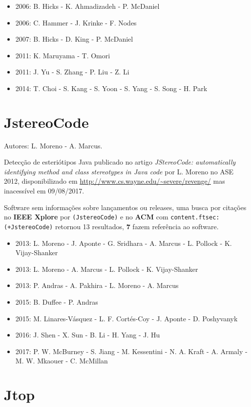 \begin{itemize}
\item 2006: B. Hicks - K. Ahmadizadeh - P. McDaniel
\item 2006: C. Hammer - J. Krinke - F. Nodes
\item 2007: B. Hicks - D. King - P. McDaniel
\item 2011: K. Maruyama - T. Omori
\item 2011: J. Yu - S. Zhang - P. Liu - Z. Li
\item 2014: T. Choi - S. Kang - S. Yoon - S. Yang - S. Song - H. Park
\end{itemize}

\section{JstereoCode}

Autores:
L. Moreno - A. Marcus.

Detecção de esteriótipos Java
publicado no artigo {\it JStereoCode: automatically identifying method and class stereotypes in Java code}
por L. Moreno
no ASE 2012,
disponibilizado em \url{http://www.cs.wayne.edu/~severe/revenge/}
mas inacessível em 09/08/2017.

Software sem informações sobre lançamentos ou releases,
uma busca por citações no {\bf IEEE Xplore} por
\texttt{(JstereoCode)}
e no {\bf ACM} com
\texttt{content.ftsec:(+JstereoCode)}
retornou
13 resultados,
{\bf 7} fazem referência ao software.

\begin{itemize}
\item 2013: L. Moreno - J. Aponte - G. Sridhara - A. Marcus - L. Pollock - K. Vijay-Shanker
\item 2013: L. Moreno - A. Marcus - L. Pollock - K. Vijay-Shanker
\item 2013: P. Andras - A. Pakhira - L. Moreno - A. Marcus
\item 2015: B. Duffee - P. Andras
\item 2015: M. Linares-V\'{a}squez - L. F. Cort{\'e}s-Coy - J. Aponte - D. Poshyvanyk
\item 2016: J. Shen - X. Sun - B. Li - H. Yang - J. Hu
\item 2017: P. W. McBurney - S. Jiang - M. Kessentini - N. A. Kraft - A. Armaly - M. W. Mkaouer - C. McMillan
\end{itemize}

\section{Jtop}

